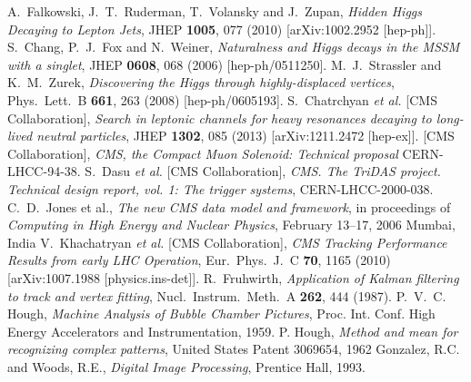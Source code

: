 \documentclass{JINST}
\begin{document}
\begin{thebibliography}{9}
%
%
  A.~Falkowski, J.~T.~Ruderman, T.~Volansky and J.~Zupan,
  \emph{Hidden Higgs Decaying to Lepton Jets},
  JHEP {\bf 1005}, 077 (2010)
  [arXiv:1002.2952 [hep-ph]].
%
%
  S.~Chang, P.~J.~Fox and N.~Weiner,
  \emph{Naturalness and Higgs decays in the MSSM with a singlet},
  JHEP {\bf 0608}, 068 (2006)
  [hep-ph/0511250].
%
%
  M.~J.~Strassler and K.~M.~Zurek,
\emph{Discovering the Higgs through highly-displaced vertices},
  Phys.\ Lett.\ B {\bf 661}, 263 (2008)
  [hep-ph/0605193].
%
%
  S.~Chatrchyan {\it et al.}  [CMS Collaboration],
  \emph{Search in leptonic channels for heavy resonances decaying to long-lived neutral particles},
  JHEP {\bf 1302}, 085 (2013)
  [arXiv:1211.2472 [hep-ex]].
%
%
  [CMS Collaboration],
\emph{CMS, the Compact Muon Solenoid: Technical proposal}
  CERN-LHCC-94-38.
%
%
  S.~Dasu {\it et al.}  [CMS Collaboration],
\emph{CMS. The TriDAS project. Technical design report, vol. 1: The trigger systems},
  CERN-LHCC-2000-038.
%
%
C.~D.~Jones et al.,
\emph{The new CMS data model and framework}, in proceedings of
 \emph{Computing in High Energy and Nuclear Physics}, 
February 13--17, 2006 Mumbai, India
%
%
  V.~Khachatryan {\it et al.}  [CMS Collaboration],
  \emph{CMS Tracking Performance Results from early LHC Operation},
  Eur.\ Phys.\ J.\ C {\bf 70}, 1165 (2010)
  [arXiv:1007.1988 [physics.ins-det]].
%
%
  R.~Fruhwirth,
  \emph{Application of Kalman filtering to track and vertex fitting},
  Nucl.\ Instrum.\ Meth.\ A {\bf 262}, 444 (1987).
%
%
P.~V.~C. Hough, 
\emph{Machine Analysis of Bubble Chamber Pictures}, 
Proc. Int. Conf. High Energy Accelerators and Instrumentation, 1959.
%
%
 P. Hough,
\emph{Method and mean for recognizing complex patterns}, 
United States Patent 3069654, 1962
%
%
 Gonzalez, R.C. and Woods, R.E., 
\emph{Digital Image Processing},
Prentice Hall, 1993.
%
%

\end{thebibliography}
\end{document}
